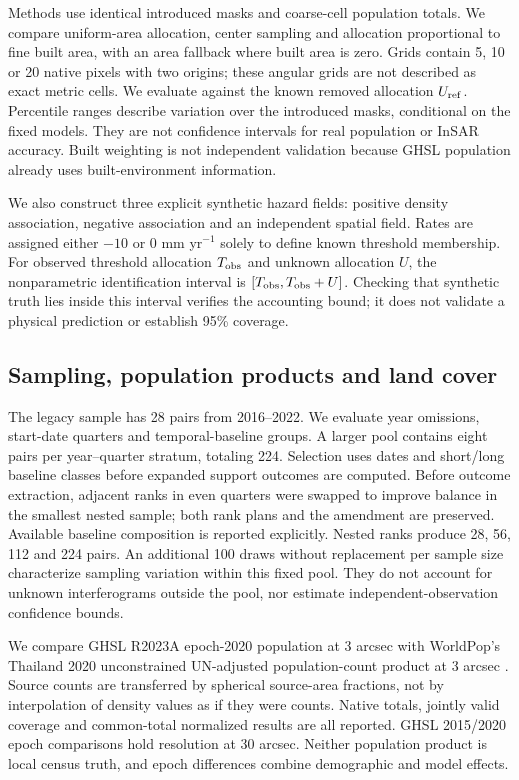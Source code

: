 \documentclass[pdflatex,lineno,sn-nature]{sn-jnl}
\begin{document}
Methods use identical introduced masks and coarse-cell population totals. We compare uniform-area allocation, center sampling and allocation proportional to fine built area, with an area fallback where built area is zero. Grids contain 5, 10 or 20 native pixels with two origins; these angular grids are not described as exact metric cells. We evaluate against the known removed allocation $U_{\rm ref}$. Percentile ranges describe variation over the introduced masks, conditional on the fixed models. They are not confidence intervals for real population or InSAR accuracy. Built weighting is not independent validation because GHSL population already uses built-environment information.

We also construct three explicit synthetic hazard fields: positive density association, negative association and an independent spatial field. Rates are assigned either $-10$ or $0$ mm yr$^{-1}$ solely to define known threshold membership. For observed threshold allocation $T_{\rm obs}$ and unknown allocation $U$, the nonparametric identification interval is $[T_{\rm obs},T_{\rm obs}+U]$. Checking that synthetic truth lies inside this interval verifies the accounting bound; it does not validate a physical prediction or establish 95\% coverage.

\subsection{Sampling, population products and land cover}
The legacy sample has 28 pairs from 2016--2022. We evaluate year omissions, start-date quarters and temporal-baseline groups. A larger pool contains eight pairs per year--quarter stratum, totaling 224. Selection uses dates and short/long baseline classes before expanded support outcomes are computed. Before outcome extraction, adjacent ranks in even quarters were swapped to improve balance in the smallest nested sample; both rank plans and the amendment are preserved. Available baseline composition is reported explicitly. Nested ranks produce 28, 56, 112 and 224 pairs. An additional 100 draws without replacement per sample size characterize sampling variation within this fixed pool. They do not account for unknown interferograms outside the pool, nor estimate independent-observation confidence bounds.

We compare GHSL R2023A epoch-2020 population at 3 arcsec with WorldPop's Thailand 2020 unconstrained UN-adjusted population-count product at 3 arcsec \citep{pesaresi2024ghsl,worldpop2020}. Source counts are transferred by spherical source-area fractions, not by interpolation of density values as if they were counts. Native totals, jointly valid coverage and common-total normalized results are all reported. GHSL 2015/2020 epoch comparisons hold resolution at 30 arcsec. Neither population product is local census truth, and epoch differences combine demographic and model effects.
\end{document}

